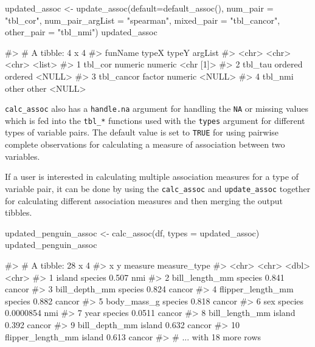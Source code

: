 \begin{Schunk}
\begin{Sinput}
updated_assoc <- update_assoc(default=default_assoc(),
                              num_pair = "tbl_cor",
                              num_pair_argList = "spearman",
                              mixed_pair = "tbl_cancor",
                              other_pair = "tbl_nmi")
updated_assoc
\end{Sinput}
\begin{Soutput}
#> # A tibble: 4 x 4
#>   funName    typeX   typeY   argList  
#>   <chr>      <chr>   <chr>   <list>   
#> 1 tbl_cor    numeric numeric <chr [1]>
#> 2 tbl_tau    ordered ordered <NULL>   
#> 3 tbl_cancor factor  numeric <NULL>   
#> 4 tbl_nmi    other   other   <NULL>
\end{Soutput}
\end{Schunk}

\texttt{calc\_assoc} also has a \texttt{handle.na} argument for handling
the \texttt{NA} or missing values which is fed into the \texttt{tbl\_*}
functions used with the \texttt{types} argument for different types of
variable pairs. The default value is set to \texttt{TRUE} for using
pairwise complete observations for calculating a measure of association
between two variables.

If a user is interested in calculating multiple association measures for
a type of variable pair, it can be done by using the
\texttt{calc\_assoc} and \texttt{update\_assoc} together for calculating
different association measures and then merging the output tibbles.

\begin{Schunk}
\begin{Sinput}
updated_penguin_assoc <- calc_assoc(df, types = updated_assoc)
updated_penguin_assoc
\end{Sinput}
\begin{Soutput}
#> # A tibble: 28 x 4
#>    x                 y         measure measure_type
#>    <chr>             <chr>       <dbl> <chr>       
#>  1 island            species 0.507     nmi         
#>  2 bill_length_mm    species 0.841     cancor      
#>  3 bill_depth_mm     species 0.824     cancor      
#>  4 flipper_length_mm species 0.882     cancor      
#>  5 body_mass_g       species 0.818     cancor      
#>  6 sex               species 0.0000854 nmi         
#>  7 year              species 0.0511    cancor      
#>  8 bill_length_mm    island  0.392     cancor      
#>  9 bill_depth_mm     island  0.632     cancor      
#> 10 flipper_length_mm island  0.613     cancor      
#> # ... with 18 more rows
\end{Soutput}
\end{Schunk}

